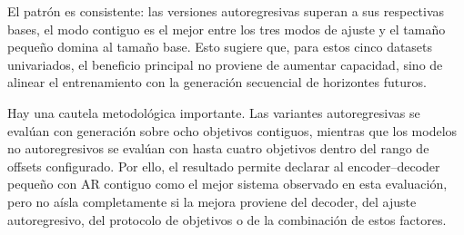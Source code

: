\begin{table}[H]
	\centering
	\caption{Medias descriptivas de variantes encoder--decoder en el benchmark legado.}
	\label{tab:encdec-final}
	\scriptsize
\end{table}

El patrón es consistente: las versiones autoregresivas superan a sus respectivas bases, el modo contiguo es el mejor entre los tres modos de ajuste y el tamaño pequeño domina al tamaño base. Esto sugiere que, para estos cinco datasets univariados, el beneficio principal no proviene de aumentar capacidad, sino de alinear el entrenamiento con la generación secuencial de horizontes futuros.

\hfill

Hay una cautela metodológica importante. Las variantes autoregresivas se evalúan con generación sobre ocho objetivos contiguos, mientras que los modelos no autoregresivos se evalúan con hasta cuatro objetivos dentro del rango de offsets configurado. Por ello, el resultado permite declarar al encoder--decoder pequeño con AR contiguo como el mejor sistema observado en esta evaluación, pero no aísla completamente si la mejora proviene del decoder, del ajuste autoregresivo, del protocolo de objetivos o de la combinación de estos factores.

